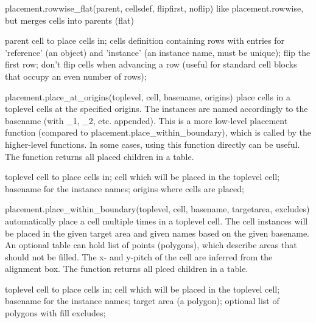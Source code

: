 \begin{APIfunc}{placement.rowwise\_flat(parent, cellsdef, flipfirst, noflip)}
    like placement.rowwise, but merges cells into parents (flat)
    \begin{APIparameters}
            parent cell to place cells in;
            cells definition containing rows with entries for 'reference' (an object) and 'instance' (an instance name, must be unique);
            flip the first row;
            don't flip cells when advancing a row (useful for standard cell blocks that occupy an even number of rows);
    \end{APIparameters}
\end{APIfunc}
\begin{APIfunc}{placement.place\_at\_origins(toplevel, cell, basename, origins)}
    place cells in a toplevel cells at the specified origins. The instances are named accordingly to the basename (with \_1, \_2, etc. appended). This is a more low-level placement function (compared to placement.place\_within\_boundary), which is called by the higher-level functions. In some cases, using this function directly can be useful. The function returns all placed children in a table.
    \begin{APIparameters}
            toplevel cell to place cells in;
            cell which will be placed in the toplevel cell;
            basename for the instance names;
            origins where cells are placed;
    \end{APIparameters}
\end{APIfunc}
\begin{APIfunc}{placement.place\_within\_boundary(toplevel, cell, basename, targetarea, excludes)}
    automatically place a cell multiple times in a toplevel cell. The cell instances will be placed in the given target area and given names based on the given basename. An optional table can hold list of points (polygons), which describe areas that should not be filled. The x- and y-pitch of the cell are inferred from the alignment box. The function returns all plced children in a table.
    \begin{APIparameters}
            toplevel cell to place cells in;
            cell which will be placed in the toplevel cell;
            basename for the instance names;
            target area (a polygon);
            optional list of polygons with fill excludes;
    \end{APIparameters}
\end{APIfunc}
